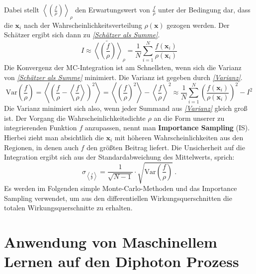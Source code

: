 Dabei stellt $\left\langle \left(\frac{f}{\rho}\right) \right\rangle_{\rho}$  den Erwartungswert von $\frac{f}{\rho}$ unter der Bedingung dar, dass die $\mathbf{x}_i$ nach der Wahrscheinlichkeitsverteilung $\rho(\mathbf{x})$ gezogen werden. Der Schätzer ergibt sich dann zu \textit{\autoref{Schätzer als Summe}}.
\begin{equation}
I \approx \tilde{\left\langle \left(\frac{f}{\rho}\right) \right\rangle}_{\rho}  = \frac{1}{N}\sum_{i=1}^{N}\frac{f(\mathbf{x}_i)}{\rho(\mathbf{x}_i)}
\label{Schätzer als Summe}
\end{equation}
Die Konvergenz der MC-Integration ist am Schnellsten, wenn sich die Varianz von \textit{\autoref{Schätzer als Summe}} minimiert. Die Varianz ist gegeben durch \textit{\autoref{Varianz}}.
\begin{equation}
\text{Var}\left(\frac{f}{\rho}\right) = \left\langle\left(\frac{f}{\rho} - \left\langle \frac{f}{\rho}\right\rangle \right)^2 \right\rangle = \left\langle \left(\frac{f}{\rho}\right)^2 \right\rangle - \left\langle\frac{f}{\rho} \right\rangle^2 \approx \frac{1}{N} \sum_{i=1}^{N}\left(\frac{f(\mathbf{x}_i)}{\rho(\mathbf{x}_i)}\right)^2 - I^2
\label{Varianz}
\end{equation}
Die Varianz minimiert sich also, wenn jeder Summand aus \textit{\autoref{Varianz}} gleich groß ist. Der Vorgang die Wahrscheinlichkeitsdichte $\rho$ an die Form unserer zu integrierenden Funktion $f$ anzupassen, nennt man \textbf{Importance Sampling} (IS). Hierbei zieht man absichtlich die $\mathbf{x}_i$ mit höheren Wahrscheinlichkeiten aus den Regionen, in denen auch $f$ den größten Beitrag liefert. Die Unsicherheit auf die Integration ergibt sich aus der Standardabweichung des Mittelwerts, sprich:
\begin{equation}
\sigma_{\left\langle \frac{f}{\rho}\right\rangle} = \frac{1}{\sqrt{N-1}} \cdot \sqrt{\text{Var}\left(\frac{f}{\rho}\right)}~.
\label{uncertainty-mc}
\end{equation}
Es werden im Folgenden simple Monte-Carlo-Methoden und das Importance Sampling verwendet, um aus den differentiellen Wirkungsquerschnitten die totalen Wirkungsquerschnitte zu erhalten.   
\chapter{Anwendung von Maschinellem Lernen auf den Diphoton Prozess}
\label{4}
